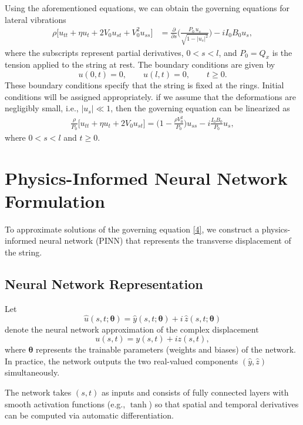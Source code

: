 \documentclass{article}
\begin{document}
Using the aforementioned equations, we can obtain the governing equations for lateral vibrations
\begin{align}
\rho \Bigg[
    u_{tt} + \eta u_{t} + 2 V_0 u_{st} + V_0^2 u_{ss}
\Bigg]
&= \frac{\partial}{\partial s}
\Bigg(
    \frac{P_0 \, u_s}
    {\sqrt{1 - \lvert u_s \rvert^2}}
\Bigg)
- i I_0 B_0 u_s,
\end{align}
where the subscripts represent partial derivatives, $0<s<l$, and $P_0 = Q_x$ is the tension applied to the string at rest. The boundary conditions are given by
\begin{equation}  
u(0,t) = 0, \qquad u(l,t) = 0, \qquad t \geq 0.
\end{equation}
These boundary conditions specify that the string is fixed at the rings. Initial conditions will be assigned appropriately. if we assume that the deformations are negligibly small, i.e., $\lvert u_s \rvert \ll 1$, then the governing equation can be linearized as
\begin{align}   
\frac{\rho}{P_0} \Bigg[
    u_{tt} + \eta u_{t} + 2 V_0 u_{st} \Bigg] = \Bigg(1 - \frac{\rho V_0^2}{P_0}\Bigg) u_{ss} - i \frac{I_0 B_0}{P_0} u_s,
\end{align}
where $0<s<l$ and $t \geq 0$. 

\section{Physics-Informed Neural Network Formulation}

To approximate solutions of the governing equation \eqref{4}, we construct a physics-informed neural network (PINN) that represents the transverse displacement of the string.

\subsection{Neural Network Representation}

Let
\[
\hat{u}(s,t;\bm{\theta}) = \hat{y}(s,t;\bm{\theta}) + i\,\hat{z}(s,t;\bm{\theta})
\]
denote the neural network approximation of the complex displacement
\[
u(s,t) = y(s,t) + i z(s,t),
\]
where $\bm{\theta}$ represents the trainable parameters (weights and biases) of the network. In practice, the network outputs the two real-valued components $(\hat{y}, \hat{z})$ simultaneously.

The network takes $(s,t)$ as inputs and consists of fully connected layers with smooth activation functions (e.g., $\tanh$) so that spatial and temporal derivatives can be computed via automatic differentiation.
\end{document}
